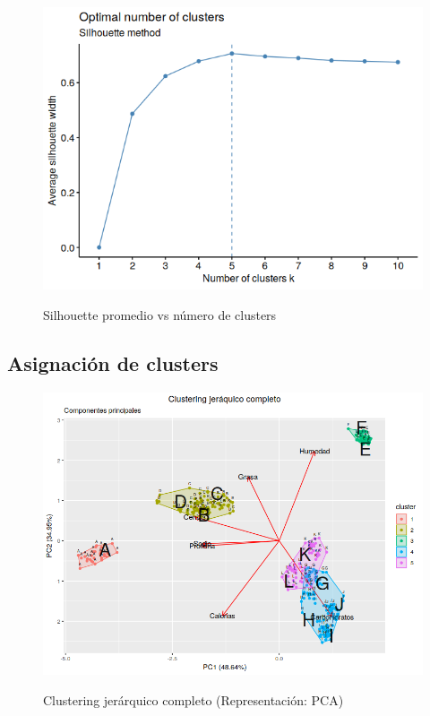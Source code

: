 \documentclass[pdf]{beamer}
\begin{document}
\begin{frame}
\begin{figure}[h]
\centering
	\includegraphics[scale=.5]{images/clusterSilhouette.png} 
	\label{i_cluster_Silhouette}
	\caption{Silhouette promedio vs número de clusters}
\end{figure}
\end{frame}


\subsection{Asignación de clusters}

\begin{frame}
\begin{figure}[h]
\centering
	\includegraphics[scale=.35]{images/clusterPCA.png} 
	\label{i_cluster_PCA}
	\caption{Clustering jerárquico completo (Representación: PCA)}
\end{figure}
\end{frame}
\end{document}
